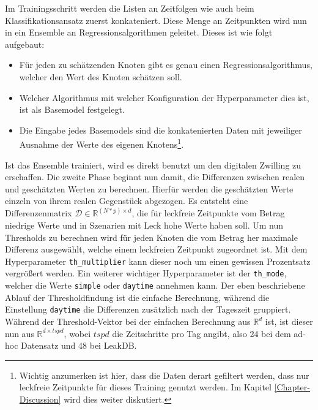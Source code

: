 Im Trainingsschritt werden die Listen an Zeitfolgen wie auch beim Klassifikationsansatz zuerst konkateniert.
 Diese Menge an Zeitpunkten wird nun in ein Ensemble an Regressionsalgorithmen geleitet. Dieses ist wie folgt
 aufgebaut:

\begin{itemize}
    \item Für jeden zu schätzenden Knoten gibt es genau einen Regressionsalgorithmus, welcher den Wert des Knoten
     schätzen soll.
    \item Welcher Algorithmus mit welcher Konfiguration der Hyperparameter dies ist, ist als Basemodel festgelegt.
    \item Die Eingabe jedes Basemodels sind die konkatenierten Daten mit jeweiliger Ausnahme der Werte des eigenen
     Knotens\footnote{Wichtig anzumerken ist hier, dass die Daten derart gefiltert werden, dass nur leckfreie
     Zeitpunkte für dieses Training genutzt werden. Im Kapitel \ref{Chapter-Discussion} wird dies weiter
     diskutiert.}.
\end{itemize}

Ist das Ensemble trainiert, wird es direkt benutzt um den digitalen Zwilling zu erschaffen. Die zweite Phase
 beginnt nun damit, die Differenzen zwischen realen und geschätzten Werten zu berechnen. Hierfür werden die
 geschätzten Werte einzeln von ihrem realen Gegenstück abgezogen. Es entsteht eine Differenzenmatrix
 $\mathcal{D} \in \mathbb{R}^{(N*p) \times d}$, die für leckfreie Zeitpunkte vom Betrag niedrige Werte und in
 Szenarien mit Leck hohe Werte haben soll. Um nun Thresholds zu berechnen wird für jeden Knoten die vom Betrag
 her maximale Differenz ausgewählt, welche einem leckfreien Zeitpunkt zugeordnet ist. Mit dem Hyperparameter
 \texttt{th\_multiplier} kann dieser noch um einen gewissen Prozentsatz vergrößert werden. Ein weiterer wichtiger
 Hyperparameter ist der \texttt{th\_mode}, welcher die Werte \texttt{simple} oder \texttt{daytime} annehmen kann.
 Der eben beschriebene Ablauf der Thresholdfindung ist die einfache Berechnung, während die Einstellung
 \texttt{daytime} die Differenzen zusätzlich nach der Tageszeit gruppiert. Während der Threshold-Vektor bei der
 einfachen Berechnung aus $\mathbb{R}^d$ ist, ist dieser nun aus $\mathbb{R}^{d \times tspd}$, wobei $tspd$ die
 Zeitschritte pro Tag angibt, also 24 bei dem ad-hoc Datensatz und 48 bei LeakDB.

